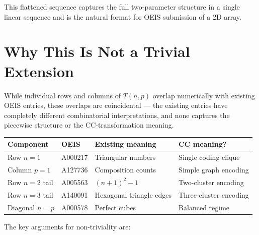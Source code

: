 \documentclass[11pt,a4paper]{article}
\theoremstyle{definition}
\begin{document}
This flattened sequence captures the full two-parameter structure in a single linear sequence and is the natural format for OEIS submission of a 2D array.

\section{Why This Is Not a Trivial Extension}

While individual rows and columns of $T(n, p)$ overlap numerically with existing OEIS entries, these overlaps are coincidental --- the existing entries have completely different combinatorial interpretations, and none captures the piecewise structure or the CC-transformation meaning.

\begin{center}
\begin{tabular}{llll}
\toprule
Component & OEIS & Existing meaning & CC meaning? \\
\midrule
Row $n = 1$ & A000217 & Triangular numbers & Single coding clique \\
Column $p = 1$ & A127736 & Composition counts & Simple graph encoding \\
Row $n = 2$ tail & A005563 & $(n+1)^2 - 1$ & Two-cluster encoding \\
Row $n = 3$ tail & A140091 & Hexagonal triangle edges & Three-cluster encoding \\
Diagonal $n = p$ & A000578 & Perfect cubes & Balanced regime \\
\bottomrule
\end{tabular}
\end{center}

The key arguments for non-triviality are:
\end{document}
